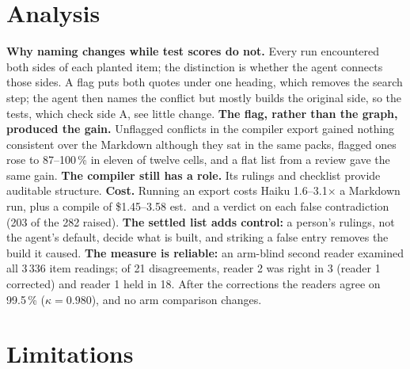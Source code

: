 \documentclass{article}
\begin{document}
\section{Analysis}

\textbf{Why naming changes while test scores do not.} Every run encountered both sides of each planted item; the distinction is whether the agent connects those sides. A flag puts both quotes under one heading, which removes the search step;
the agent then names the conflict but mostly builds the original side, so the tests, which check side A,
see little change. \textbf{The flag, rather than the graph, produced the gain.} Unflagged conflicts in the
compiler export gained nothing consistent over the Markdown although they sat in the same packs, flagged
ones rose to 87--100\,\% in eleven of twelve cells, and a flat list from a review gave the same gain.
\textbf{The compiler still has a role.} Its rulings and checklist provide auditable structure. \textbf{Cost.} Running an export costs
Haiku 1.6--3.1$\times$ a Markdown run, plus a compile of \$1.45--3.58 est.\ and a verdict on each false
contradiction (203 of the 282 raised). \textbf{The settled list adds control:} a person's rulings, not the agent's default, decide what is built, and striking a false entry
removes the build it caused. \textbf{The measure is reliable:} an arm-blind second reader examined all 3\,336 item
readings; of 21 disagreements, reader 2 was right in 3 (reader 1 corrected) and reader 1 held in 18. After
the corrections the readers agree on 99.5\,\% ($\kappa = 0.980$), and no arm comparison changes.

\section{Limitations}\label{sec:limits}
\end{document}
